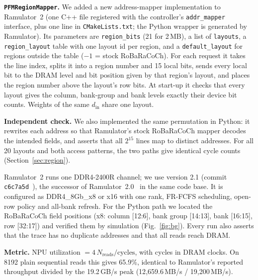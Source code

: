 \documentclass[conference]{IEEEtran}
\begin{document}
\textbf{\texttt{PFMRegionMapper}.} We added a new address-mapper implementation to Ramulator~2 (one C++ file registered with the controller's \texttt{addr\_mapper} interface, plus one line in \texttt{CMakeLists.txt}; the Python wrapper is generated by Ramulator). Its parameters are \texttt{region\_bits} (21 for 2\,MB), a list of \texttt{layouts}, a \texttt{region\_layout} table with one layout id per region, and a \texttt{default\_layout} for regions outside the table ($-1$ = stock RoBaRaCoCh). For each request it takes the line index, splits it into a region number and 15 local bits, sends every local bit to the DRAM level and bit position given by that region's layout, and places the region number above the layout's row bits. At start-up it checks that every layout gives the column, bank-group and bank levels exactly their device bit counts. Weights of the same $d_{\mathrm{in}}$ share one layout.

\textbf{Independent check.} We also implemented the same permutation in Python: it rewrites each address so that Ramulator's stock RoBaRaCoCh mapper decodes the intended fields, and asserts that all $2^{15}$ lines map to distinct addresses. For all 20 layouts and both access patterns, the two paths give identical cycle counts (Section~\ref{sec:region}).

Ramulator~2 runs one DDR4-2400R channel; we use version 2.1 (commit \texttt{c6c7a5d}~\cite{luo2026ramulator21}), the successor of Ramulator~2.0~\cite{luo2024ramulator2} in the same code base. It is configured as DDR4\_8Gb\_x8 or x16 with one rank, FR-FCFS scheduling, open-row policy and all-bank refresh. For the Python path we located the RoBaRaCoCh field positions (x8: column [12:6], bank group [14:13], bank [16:15], row [32:17]) and verified them by simulation (Fig.~\ref{fig:bg}). Every run also asserts that the trace has no duplicate addresses and that all reads reach DRAM.

\textbf{Metric.} NPU utilization $=4\,N_{\mathrm{reads}}/\mathrm{cycles}$, with cycles in DRAM clocks. On 8192 plain sequential reads this gives 65.9\%, identical to Ramulator's reported throughput divided by the 19.2\,GB/s peak (12{,}659.6\,MB/s / 19{,}200\,MB/s).
\end{document}
